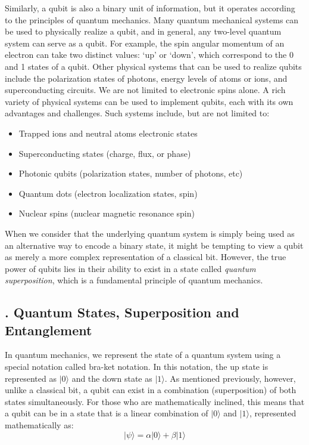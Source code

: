 \documentclass{elbioimp2}
\begin{document}
Similarly, a qubit is also a binary unit of information, but it operates according to the principles of quantum mechanics. Many quantum mechanical systems can be used to physically realize a qubit, and in general, any two-level quantum system can serve as a qubit. For example, the spin angular momentum of an electron can take two distinct values: `up' or `down', which correspond to the 0 and 1 states of a qubit. Other physical systems that can be used to realize qubits include the polarization states of photons, energy levels of atoms or ions, and superconducting circuits. We are not limited to electronic spins alone. A rich variety of physical systems can be used to implement qubits, each with its own advantages and challenges. Such systems include, but are not limited to:
\begin{itemize}
  \item Trapped ions and neutral atoms electronic states
  \item Superconducting states (charge, flux, or phase)
  \item Photonic qubits (polarization states, number of photons, etc)
  \item Quantum dots (electron localization states, spin)
  \item Nuclear spins (nuclear magnetic resonance spin)
\end{itemize}

When we consider that the underlying quantum system is simply being used as an alternative way to encode a binary state, it might be tempting to view a qubit as merely a more complex representation of a classical bit. However, the true power of qubits lies in their ability to exist in a state called \textit{quantum superposition}, which is a fundamental principle of quantum mechanics.


\subsection{. Quantum States, Superposition and Entanglement}
In quantum mechanics, we represent the state of a quantum system using a special notation called bra-ket notation. In this notation, the up state is represented as $|0\rangle$ and the down state as $|1\rangle$. As mentioned previously, however, unlike a classical bit, a qubit can exist in a combination (superposition) of both states simultaneously. For those who are mathematically inclined, this means that a qubit can be in a state that is a linear combination of $|0\rangle$ and $|1\rangle$, represented mathematically as:
\begin{equation}
  |\psi\rangle = \alpha|0\rangle + \beta|1\rangle
\end{equation}
\end{document}
